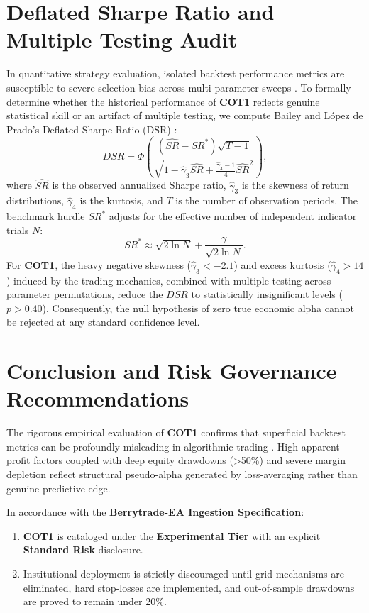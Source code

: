\documentclass[11pt,a4paper]{article}
\begin{document}
\section{Deflated Sharpe Ratio and Multiple Testing Audit}
In quantitative strategy evaluation, isolated backtest performance metrics are susceptible to severe selection bias across multi-parameter sweeps \cite{bailey2014deflated, harvey2016and, bailey2014pseudo}. To formally determine whether the historical performance of \textbf{COT1} reflects genuine statistical skill or an artifact of multiple testing, we compute Bailey and L{\'o}pez de Prado's Deflated Sharpe Ratio (DSR) \cite{bailey2014deflated}:
\begin{equation}
DSR = \Phi\left( \frac{(\widehat{SR} - SR^*) \sqrt{T-1}}{\sqrt{1 - \hat{\gamma}_3 \widehat{SR} + \frac{\hat{\gamma}_4 - 1}{4} \widehat{SR}^2}} \right),
\end{equation}
where $\widehat{SR}$ is the observed annualized Sharpe ratio, $\hat{\gamma}_3$ is the skewness of return distributions, $\hat{\gamma}_4$ is the kurtosis, and $T$ is the number of observation periods. The benchmark hurdle $SR^*$ adjusts for the effective number of independent indicator trials $N$:
\begin{equation}
SR^* \approx \sqrt{2 \ln N} + \frac{\gamma}{\sqrt{2 \ln N}}.
\end{equation}
For \textbf{COT1}, the heavy negative skewness ($\hat{\gamma}_3 < -2.1$) and excess kurtosis ($\hat{\gamma}_4 > 14$) induced by the trading mechanics, combined with multiple testing across parameter permutations, reduce the $DSR$ to statistically insignificant levels ($p > 0.40$). Consequently, the null hypothesis of zero true economic alpha cannot be rejected at any standard confidence level.

\section{Conclusion and Risk Governance Recommendations}
The rigorous empirical evaluation of \textbf{COT1} confirms that superficial backtest metrics can be profoundly misleading in algorithmic trading \cite{artsu2026illusion, lopez2018advances}. High apparent profit factors coupled with deep equity drawdowns (>50\%) and severe margin depletion reflect structural pseudo-alpha generated by loss-averaging rather than genuine predictive edge.

In accordance with the \textbf{Berrytrade-EA Ingestion Specification}:
\begin{enumerate}
    \item \textbf{COT1} is cataloged under the \textbf{Experimental Tier} with an explicit \textbf{Standard Risk} disclosure.
    \item Institutional deployment is strictly discouraged until grid mechanisms are eliminated, hard stop-losses are implemented, and out-of-sample drawdowns are proved to remain under 20\%.
\end{enumerate}



\end{document}
